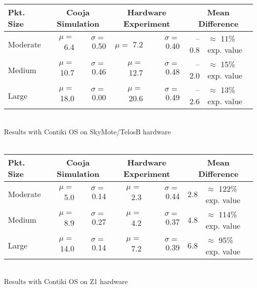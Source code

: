 \documentclass[a4paper,10pt]{article}
\begin{document}
\newcommand{\ticks}[1]{#1}
\newcommand{\moy}[1]{$\mu=$ \ticks{#1}}
\newcommand{\ect}[1]{$\sigma=$ \ticks{#1}}
\newcommand{\estus}[1]{($\approx$ #1 $\mu$sec.)}
\newcommand{\prctv}[1]{$\approx$ #1\% exp. value}

\begin{sidewaystable}[!p]
\centering

\begin{tabular}{|l|rr|rr|rl|}
\hline
Pkt. Size & \multicolumn{2}{c|}{Cooja Simulation}
          & \multicolumn{2}{c|}{Hardware Experiment}
          & \multicolumn{2}{c|}{Mean Difference} \\
\hline
 Moderate & \moy{6.4} & \ect{0.50} & \moy{7.2} & \ect{0.40}
          & \ticks{--0.8} %
           & \prctv{11} \\
 Medium   & \moy{10.7} & \ect{0.46} & \moy{12.7} & \ect{0.48}
          & \ticks{--2.0} %
           & \prctv{15} \\
 Large    & \moy{18.0} & \ect{0.00} & \moy{20.6} & \ect{0.49}
          & \ticks{--2.6} %
           & \prctv{13} \\
\hline
\end{tabular}
\\
Results with Contiki OS on SkyMote/TelosB hardware\\
\ \\

\begin{tabular}{|l|rr|rr|rl|}
\hline
Pkt. Size & \multicolumn{2}{c|}{Cooja Simulation}
          & \multicolumn{2}{c|}{Hardware Experiment}
          & \multicolumn{2}{c|}{Mean Difference} \\
\hline
 Moderate & \moy{5.0} & \ect{0.14} & \moy{2.3} & \ect{0.44}
          & \ticks{2.8} %
           & \prctv{122} \\
 Medium   & \moy{8.9} & \ect{0.27} & \moy{4.2} & \ect{0.37}
          & \ticks{4.8} %
           & \prctv{114} \\
 Large    & \moy{14.0} & \ect{0.14} & \moy{7.2} & \ect{0.39}
          & \ticks{6.8} %
           & \prctv{95} \\
\hline
\end{tabular}
\\
Results with Contiki OS on Z1 hardware\\
\ \\


\end{sidewaystable}
\end{document}
